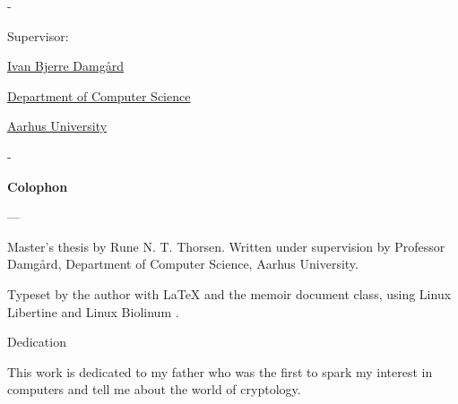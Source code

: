 \begin{titlingpage}
\begin{adjustwidth*}{\frontpagecorrection-2cm}{-\frontpagecorrection-2cm}
    \bigskip

    \fontsize{14pt}{18pt}\selectfont
    \par
    \par

    \vfill

    Supervisor: \par
    \href{https://pure.au.dk/portal/da/persons/ivan-bjerre-damgaard(70603eb5-52fd-41e3-8752-15d803c3af5c).html}{Ivan Bjerre Damgård} \par

    \vfill

    \fontsize{12pt}{14.5pt}\selectfont
    \href{https://www.cs.au.dk/}{Department of Computer Science}\par
    \href{https://www.au.dk/}{Aarhus University}

  \end{adjustwidth*}

  \newpage
  \begin{adjustwidth*}{\frontpagecorrection}{-\frontpagecorrection}
    \thispagestyle{empty}
    \strut\vfill
    {
      \setlength{\parindent}{0pt}
      \addtolength{\parskip}{.6em}

      \begin{center}
        \bfseries\sffamily Colophon
      \end{center}

      \small

      \textsl{\projecttitle}

      {--- \textsl{\projecttitledanish}}

      \smallskip

      Master's thesis by Rune N. T. Thorsen. Written under supervision by Professor Damgård,
      Department of Computer Science, Aarhus University.

      Typeset by the author with \LaTeX{} and the \textsf{memoir} document class,
      using Linux Libertine and Linux Biolinum {\fontandleading}.

    }
  \end{adjustwidth*}
\end{titlingpage}

\thispagestyle{chapter}

\begin{multiabstract}{Dedication}
\begin{center} This work is dedicated to my father who was the first to spark my interest in computers and tell me about the world of cryptology. \end{center}
\end{multiabstract}

